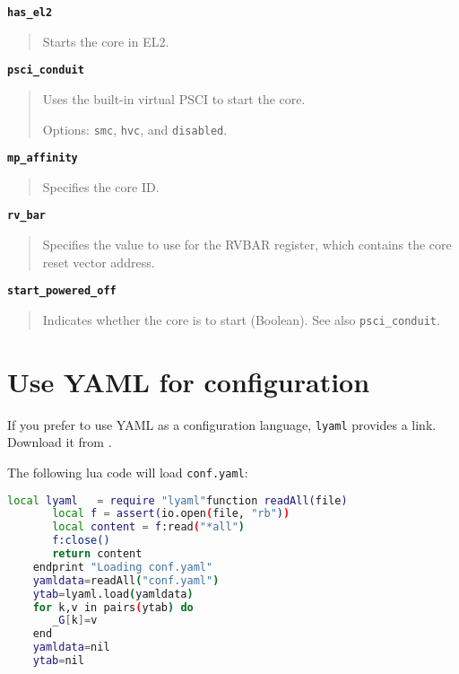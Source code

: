 {\textbf {\footnotesize{\lstinline!has_el2!}}}
\vspace{-2pt}
\begin{quote}
Starts the core in EL2.
\end{quote}


{\textbf {\footnotesize{\lstinline!psci_conduit!}}}
\vspace{-2pt}
\begin{quote}
Uses the built-in virtual PSCI to start the core.

Options: {\small{\lstinline!smc!}}, {\small{\lstinline!hvc!}}, and {\small{\lstinline!disabled!}}.
\end{quote}


{\textbf {\footnotesize{\lstinline!mp_affinity!}}}
\vspace{-2pt}
\begin{quote}
Specifies the core ID.
\end{quote}


{\textbf {\footnotesize{\lstinline!rv_bar!}}}
\vspace{-2pt}
\begin{quote}
Specifies the value to use for the RVBAR register, which contains the core reset vector address.
\end{quote}


{\textbf {\footnotesize{\lstinline!start_powered_off!}}}
\vspace{-2pt}
\begin{quote}
Indicates whether the core is to start (Boolean). See also {\small{\lstinline!psci_conduit!}}.
\end{quote}


\section{Use YAML for configuration}

If you prefer to use YAML as a configuration language, {\small{\lstinline!lyaml!}} provides a link. Download it from {}.

The following lua code will load {\small{\lstinline!conf.yaml!}}:

\small
\begin{lstlisting}[language=bash]
    local lyaml   = require "lyaml"function readAll(file)
       local f = assert(io.open(file, "rb"))
       local content = f:read("*all")
       f:close()
       return content
    endprint "Loading conf.yaml"
    yamldata=readAll("conf.yaml")
    ytab=lyaml.load(yamldata)
    for k,v in pairs(ytab) do
       _G[k]=v
    end
    yamldata=nil
    ytab=nil
\end{lstlisting}
\normalsize


